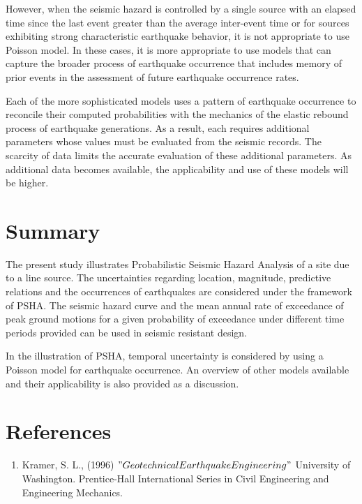 \documentclass[a4paper,english,12pt]{article}
\begin{document}
However, when the seismic hazard is controlled by a single source with an elapsed time since the last event greater than the average inter-event time or for sources exhibiting strong characteristic earthquake behavior, it is not appropriate to use Poisson model. In these cases, it is more appropriate to use models that can capture the broader process of earthquake occurrence that includes memory of prior events in the assessment of future earthquake occurrence rates.

Each of the more sophisticated models uses a pattern of earthquake occurrence to reconcile their computed probabilities with the mechanics of the elastic rebound process of earthquake generations. As a result, each requires additional parameters whose values must be evaluated from the seismic records. The scarcity of data limits the accurate evaluation of these additional parameters. As additional data becomes available, the applicability and use of these models will be higher.
\section{Summary}
The present study illustrates Probabilistic Seismic Hazard Analysis of a site due to a line source. The uncertainties regarding location, magnitude, predictive relations and the occurrences of earthquakes are considered under the framework of PSHA. The seismic hazard curve and the mean annual rate of exceedance of peak ground motions for a given probability of exceedance under different time periods provided can be used in seismic resistant design.

In the illustration of PSHA, temporal uncertainty is considered by using a Poisson model for earthquake occurrence. An overview of other models available and their applicability is also provided as a discussion.
\section{References}
\begin{enumerate}
\item Kramer, S. L., (1996) $"Geotechnical Earthquake Engineering"$ University of Washington. Prentice-Hall International Series in Civil Engineering and Engineering Mechanics.
\end{enumerate}
\end{document}
